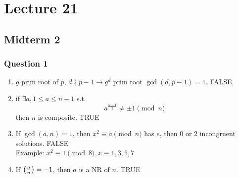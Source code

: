 \chapter{Lecture 21}
\date{November 12, 2024}

\section{Midterm 2}
    \subsection{Question 1}
    \begin{enumerate}
        \item $g$ prim root of $p$, $d\nmid p-1 \longrightarrow g^d$ prim root $\gcd(d,p-1) = 1$. FALSE
        \item if $\exists a, 1\le a\le n-1$ s.t.
            \[
                a^{\frac{n-1}{2}}\ne \pm 1 \pmod{n}
            \]
            then $n$ is composite. TRUE
        \item If $\gcd(a,n) = 1$, then $x^2\equiv a\pmod{n}$
            has $e$, then 0 or 2 incongruent solutions. FALSE \\
            Example: $x^2\equiv 1\pmod{8}, x\equiv 1,3,5,7$
        \item If $\left( \frac{a}{n} \right)  = -1$, then $a$ is a NR of $n$. TRUE
    \end{enumerate}

